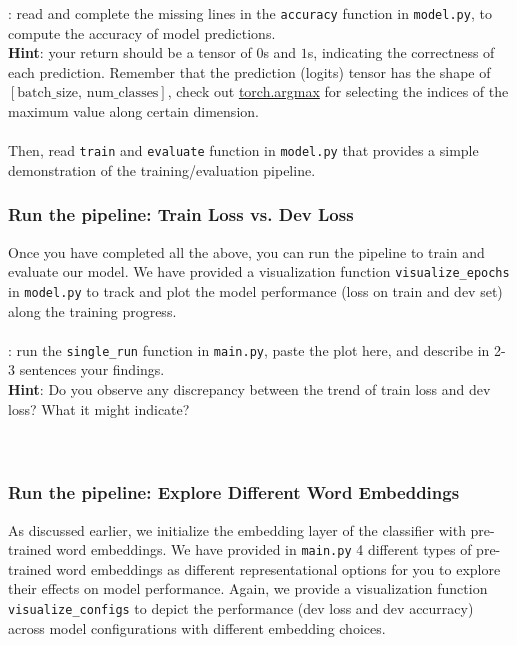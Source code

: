    \noindent \todo{}: read and complete the missing lines in the \texttt{accuracy} function in \texttt{model.py}, to compute the accuracy of model predictions.\\
    \noindent \textbf{Hint}: your return should be a tensor of $0$s and $1$s, indicating the correctness of each prediction. Remember that the prediction (logits) tensor has the shape of $[\text{batch\_size}, \, \text{num\_classes}]$, check out \href{https://pytorch.org/docs/stable/generated/torch.argmax.html}{torch.argmax} for selecting the indices of the maximum value along certain dimension.\\\\
    Then, read \texttt{train} and \texttt{evaluate} function in \texttt{model.py} that provides a simple demonstration of the training/evaluation pipeline.

    \subsubsection{Run the pipeline: Train Loss vs. Dev Loss}
    Once you have completed all the \todo{} above, you can run the pipeline to train and evaluate our model. We have provided a visualization function \texttt{visualize\_epochs} in \texttt{model.py} to track and plot the model performance (loss on train and dev set) along the training progress.\\\\
    \noindent \todo{}: run the \texttt{single\_run} function in \texttt{main.py}, paste the plot here, and describe in 2-3 sentences your findings.\\
    \noindent \textbf{Hint}: Do you observe any discrepancy between the trend of train loss and dev loss? What it might indicate?
    \\\\
    \noindent {\color{red}{your plots and answer:}}\\

    \noindent\solution{}

    \subsubsection{Run the pipeline: Explore Different Word Embeddings}
    As discussed earlier, we initialize the embedding layer of the classifier with pre-trained word embeddings. We have provided in \texttt{main.py} 4 different types of pre-trained word embeddings as different representational options for you to explore their effects on model performance. Again, we provide a visualization function \texttt{visualize\_configs} to depict the performance (dev loss and dev accurracy) across model configurations with different embedding choices. \\\\

